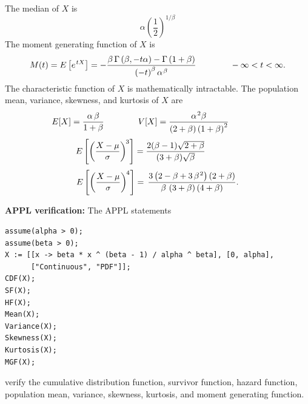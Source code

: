 \documentclass[12pt,fullpage]{article}
\begin{document}
The median of $X$ is
$$
\alpha \left(\frac{1} {2} \right) ^ {1 / \beta}
$$
The moment generating function of $X$ is
$$
M(t) = E\left[ e ^ {\kern 0.08 em tX} \right] = - \frac{ {\beta} \, \Gamma  \left( {\beta}, -t {\alpha} \right) -\Gamma 
 \left( 1 + {\beta} \right)} {\left( -t \right) ^ {{\beta}} {{\alpha}} ^ {{\kern 0.08 em\beta}}}   \qquad \qquad -\infty < t < \infty.
$$
The characteristic function of $X$ is mathematically intractable. The population mean, variance, skewness, and kurtosis of $X$ are
$$
E[X] = {\frac {{\alpha} \, {\beta}} {1 + {\beta}}} \qquad \qquad
V[X] = {\frac {{{\alpha}} ^ {\kern 0.08 em 2} {\beta}} { \left( 2 + {\beta} \right) 
 \left( 1 + {\beta} \right) ^ {2}}} \qquad \qquad
$$
$$
E\left[ \left( \frac{X - \mu} {\sigma} \right) ^ {\kern -0.08 em 3} \right] = \frac{2 (\beta - 1) \sqrt{2 + \beta}} {(3 + \beta) \sqrt{\beta}} \qquad \qquad 
$$
$$
E\left[ \left( \frac{X - \mu}{\sigma} \right) ^ {\kern -0.08 em 4} \right] = \,{\frac {3 \left( 2 - {\beta} + 3 \, {{\beta}} ^ {\kern 0.08 em 2} \right)  \left( 2 +
{\beta} \right) }{{\beta} \, \left( 3 + {\beta} \right)  \left( 
4 + {\beta} \right) }}.
$$


\vspace{0.1in}

\noindent
{\bf APPL verification:}
The APPL statements
\begin{verbatim}
assume(alpha > 0);
assume(beta > 0);
X := [[x -> beta * x ^ (beta - 1) / alpha ^ beta], [0, alpha],
      ["Continuous", "PDF"]];
CDF(X);
SF(X);
HF(X);
Mean(X);
Variance(X);
Skewness(X);
Kurtosis(X);
MGF(X);
\end{verbatim}
verify the cumulative distribution function, survivor function, hazard function, population mean, variance, skewness, kurtosis, and moment generating function.
\end{document}
